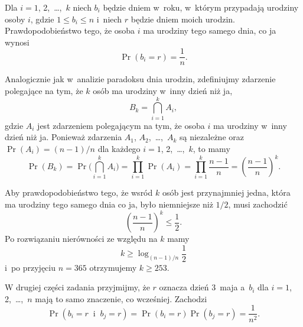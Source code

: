 
\exercise %
Dla $i=1$, 2,~\dots,~$k$ niech $b_i$ będzie dniem w~roku, w~którym przypadają urodziny osoby $i$, gdzie $1\le b_i\le n$ i~niech $r$ będzie dniem moich urodzin. Prawdopodobieństwo tego, że osoba $i$ ma urodziny tego samego dnia, co ja wynosi
\[
	\Pr(b_i=r) = \frac{1}{n}.
\]

Analogicznie jak w~analizie paradoksu dnia urodzin, zdefiniujmy zdarzenie polegające na tym, że $k$ osób ma urodziny w~inny dzień niż ja,
\[
	B_k = \bigcap_{i=1}^kA_i,
\]
gdzie $A_i$ jest zdarzeniem polegającym na tym, że osoba $i$ ma urodziny w~inny dzień niż ja. Ponieważ zdarzenia $A_1$, $A_2$,~\dots,~$A_k$ są niezależne oraz $\Pr(A_i)=(n-1)/n$ dla każdego $i=1$, 2,~\dots,~$k$, to mamy
\[
	\Pr(B_k) = \Pr\biggl(\bigcap_{i=1}^kA_i\biggr) = \prod_{i=1}^k\Pr(A_i) = \prod_{i=1}^k\frac{n-1}{n} = \left(\frac{n-1}{n}\right)^k.
\]

Aby prawdopodobieństwo tego, że wsród $k$ osób jest przynajmniej jedna, która ma urodziny tego samego dnia co ja, było niemniejsze niż $1/2$, musi zachodzić
\[
	\left(\frac{n-1}{n}\right)^k \le \frac{1}{2}.
\]
Po rozwiązaniu nierówności ze względu na $k$ mamy
\[
	k \ge \log_{(n-1)/n}\frac{1}{2}
\]
i~po przyjęciu $n=365$ otrzymujemy $k\ge253$.

W drugiej części zadania przyjmijmy, że $r$ oznacza dzień 3~maja a~$b_i$ dla $i=1$, 2,~\dots,~$n$ mają to samo znaczenie, co wcześniej. Zachodzi
\[
	\Pr(b_i=r\;\;\text{i}\;\;b_j=r) = \Pr(b_i=r)\Pr(b_j=r) = \frac{1}{n^2}.
\]

